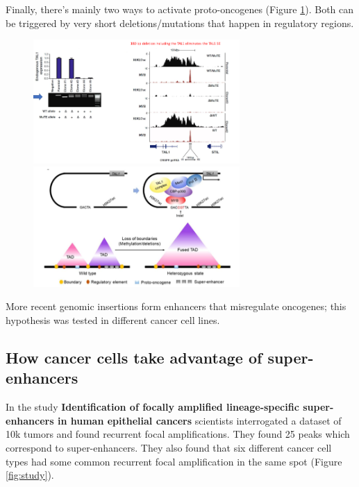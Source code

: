 Finally, there's mainly two ways to activate proto-oncogenes (Figure \ref{fig:sup}). Both can be triggered by very short deletions/mutations that happen in regulatory regions.

\begin{figure}[!htb]
   \begin{minipage}{0.48\textwidth}
     \centering
    \includegraphics[width=0.7\textwidth]{../_resources/dfb8371fc17e078308c3d5aa247ebcbf.png}
\caption{}
\label{fig:deltal}
   \end{minipage}\hfill
   \begin{minipage}{0.48\textwidth}
     \centering
     \includegraphics[width=0.7\textwidth]{../_resources/8bd5f4820c364c35b02c35eb0e48f464.png}
\caption{}
\label{fig:sup}
   \end{minipage}
\end{figure}

More recent genomic insertions form enhancers that misregulate oncogenes; this hypothesis was tested in different cancer cell lines.

\hypertarget{how-cancer-cells-take-advantage-of-super-enhancers}{%
\subsection{How cancer cells take advantage of super-enhancers}\label{how-cancer-cells-take-advantage-of-super-enhancers}}

In the study \textbf{Identification of focally amplified lineage-specific super-enhancers in human epithelial cancers} scientists interrogated a dataset of 10k tumors and found recurrent focal amplifications. They found 25 peaks which correspond to super-enhancers. They also found that six different cancer cell types had some common recurrent focal amplification in the same spot (Figure \ref{fig:study}).

